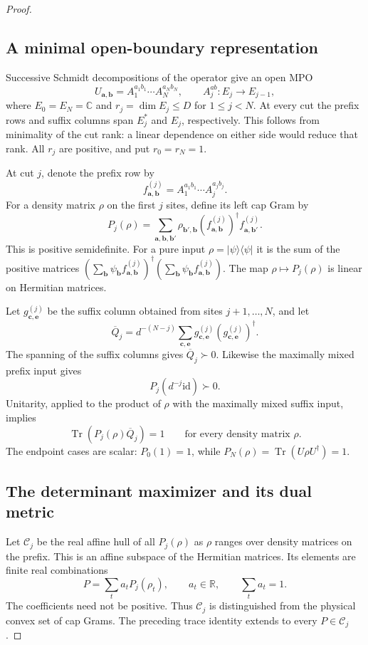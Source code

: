 \documentclass[11pt]{article}
\newcommand{\id}{\mathrm{id}}
\begin{document}
\begin{proof}
\subsection*{A minimal open-boundary representation}

Successive Schmidt decompositions of the operator give an open MPO
\[
 U_{\mathbf a,\mathbf b}
 =A_1^{a_1b_1}\cdots A_N^{a_Nb_N},
 \qquad A_j^{ab}:E_j\longrightarrow E_{j-1},
\]
where $E_0=E_N=\mathbb C$ and
$r_j=\dim E_j\leq D$ for $1\leq j<N$.
At every cut the prefix rows and suffix columns span $E_j^*$ and
$E_j$, respectively. This follows from minimality of the cut rank:
a linear dependence on either side would reduce that rank.
All $r_j$ are positive, and put $r_0=r_N=1$.

At cut $j$, denote the prefix row by
\[
 f^{(j)}_{\mathbf a,\mathbf b}
   =A_1^{a_1b_1}\cdots A_j^{a_jb_j}.
\]
For a density matrix $\rho$ on the first $j$ sites, define its
left cap Gram by
\[
 P_j(\rho)=
 \sum_{\mathbf a,\mathbf b,\mathbf b'}
 \rho_{\mathbf b',\mathbf b}
 (f^{(j)}_{\mathbf a,\mathbf b})^\dagger
  f^{(j)}_{\mathbf a,\mathbf b'}.
\]
This is positive semidefinite. For a pure input $\rho=|\psi\rangle
\langle\psi|$ it is the sum of the positive matrices
$(\sum_{\mathbf b}\psi_{\mathbf b}f^{(j)}_{\mathbf a,\mathbf b})^\dagger
 (\sum_{\mathbf b}\psi_{\mathbf b}f^{(j)}_{\mathbf a,\mathbf b})$.
The map $\rho\mapsto P_j(\rho)$ is linear on Hermitian matrices.

Let $g^{(j)}_{\mathbf c,\mathbf e}$ be the suffix column obtained
from sites $j+1,\ldots,N$, and let
\[
 \overline Q_j=d^{-(N-j)}
       \sum_{\mathbf c,\mathbf e}
        g^{(j)}_{\mathbf c,\mathbf e}
       (g^{(j)}_{\mathbf c,\mathbf e})^\dagger.
\]
The spanning of the suffix columns gives $\overline Q_j\succ0$.
Likewise the maximally mixed prefix input gives
\[
 P_j(d^{-j}\id)\succ0.
\]
Unitarity, applied to the product of $\rho$ with the maximally
mixed suffix input, implies
\[
 \operatorname{Tr}(P_j(\rho)\overline Q_j)=1
       \qquad\text{for every density matrix }\rho.
\]
The endpoint cases are scalar: $P_0(1)=1$, while
$P_N(\rho)=\operatorname{Tr}(U\rho U^\dagger)=1$.

\subsection*{The determinant maximizer and its dual metric}

Let $\mathcal C_j$ be the real affine hull of all $P_j(\rho)$ as
$\rho$ ranges over density matrices on the prefix. This is an
affine subspace of the Hermitian matrices. Its elements are finite
real combinations
\[
 P=\sum_t a_tP_j(\rho_t),\qquad
 a_t\in\mathbb R,\qquad\sum_ta_t=1.
\]
The coefficients need not be positive. Thus $\mathcal C_j$ is
distinguished from the physical convex set of cap Grams.
The preceding trace identity extends to every $P\in\mathcal C_j$.


\end{proof}
\end{document}
